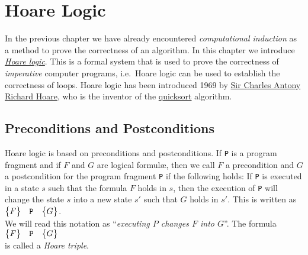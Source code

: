 \chapter{Hoare Logic}
In the previous chapter we have already encountered \emph{computational induction} as a method to
prove the correctness of an algorithm.
In this chapter we introduce \href{http://en.wikipedia.org/wiki/Hoare_logic}{\emph{Hoare logic}}.
This is a formal system that is used to prove the correctness of \emph{imperative} computer
programs, i.e.~Hoare logic can be used to establish the correctness of loops.
Hoare logic has been introduced 1969 by  
\href{http://en.wikipedia.org/wiki/C._A._R._Hoare}{Sir Charles Antony Richard Hoare}, 
who is the inventor of the \href{http://en.wikipedia.org/wiki/Quicksort}{quicksort} algorithm.
 

\section{Preconditions and Postconditions}
Hoare logic is based on preconditions and postconditions.  If \texttt{P}
 is a program fragment and if $F$ and $G$ are logical formul\ae, then we call
$F$ a precondition and $G$ a postcondition for the program fragment \texttt{P}
if the following holds:  If \texttt{P} is executed in a state $s$ such that the formula $F$ holds in
$s$, then the execution of \texttt{P} will change the state $s$ into a new state $s'$ such that 
$G$ holds in $s'$.  This is written as
\\[0.2cm]
\hspace*{1.3cm}
$ \bigl\{F\bigr\}\quad\texttt{P}\quad\bigl\{G\bigr\} $.
\\[0.2cm]
We will read this notation as ``\emph{executing $P$ changes $F$ into $G$}''.
The formula
\\[0.2cm]
\hspace*{1.3cm}
$ \bigl\{F\bigr\}\quad\texttt{P}\quad\bigl\{G\bigr\} $
\\[0.2cm]
is called a \emph{Hoare triple}.
\vspace*{0.3cm}


